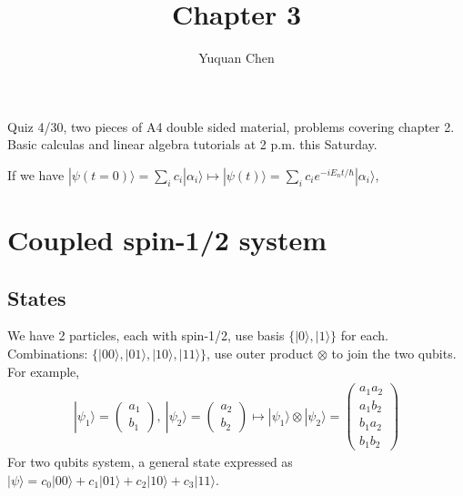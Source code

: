\documentclass[UTF8,12pt]{article} %
\begin{document}
\title{Chapter 3}
\author{Yuquan Chen}
\date{} %
\maketitle

Quiz 4/30, two pieces of A4 double sided material, problems covering chapter 2. Basic calculas and linear algebra tutorials at 2 p.m. this Saturday.

If we have $|\psi(t=0)\rangle = \sum_i c_i|\alpha_i\rangle \mapsto |\psi(t)\rangle = \sum_i c_i e^{-iE_n t/\hbar}|\alpha_i\rangle$, 

\section{Coupled spin-1/2 system}

\subsection{States}
We have 2 particles, each with spin-1/2, use basis $\{|0\rangle,|1\rangle\}$ for each. Combinations: $\{|00\rangle,|01\rangle,|10\rangle,|11\rangle\}$, use outer product $\otimes$ to join the two qubits. For example,
\begin{align}
|\psi_1\rangle = \begin{pmatrix}a_1\\b_1\end{pmatrix},~|\psi_2\rangle = \begin{pmatrix}a_2\\b_2\end{pmatrix}\longmapsto |\psi_1\rangle\otimes|\psi_2\rangle = \begin{pmatrix}a_1a_2\\a_1b_2\\b_1a_2\\b_1b_2\end{pmatrix}
\end{align}
For two qubits system, a general state expressed as $|\psi\rangle = c_0|00\rangle + c_1|01\rangle + c_2|10\rangle + c_3|11\rangle$.
\end{document}
